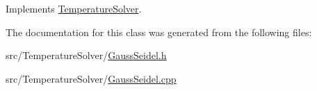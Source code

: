 Implements \mbox{\hyperlink{classTemperatureSolver_a6da00c3ea7978b30f1920dc9ea914ed6}{Temperature\+Solver}}.



The documentation for this class was generated from the following files\+:\begin{DoxyCompactItemize}
\item 
src/\+Temperature\+Solver/\mbox{\hyperlink{TemperatureSolver_2GaussSeidel_8h}{Gauss\+Seidel.\+h}}\item 
src/\+Temperature\+Solver/\mbox{\hyperlink{TemperatureSolver_2GaussSeidel_8cpp}{Gauss\+Seidel.\+cpp}}\end{DoxyCompactItemize}
